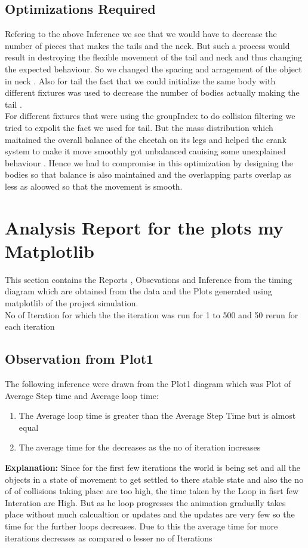 \documentclass[11pt]{article}
\begin{document}
\subsection{Optimizations Required}
Refering to the above Inference we see that we would have to decrease the number of pieces that makes the tails and the neck. 
But such a process would result in destroying the flexible movement of the tail and neck and thus changing the expected behaviour.
So we changed the spacing and arragement of the object in neck . Also for tail the fact that we could initialize the same body with
different fixtures was used to decrease the number of bodies actually making the tail .\\
For different fixtures that were using the groupIndex to do collision filtering we tried to expolit the fact we used for tail.
But the mass distribution which maitained the overall balance of the cheetah on its legs and helped the crank system to make it move smoothly
got unbalanced cauising some unexplained behaviour . Hence we had to compromise in this optimization by designing the bodies so that balance 
is also maintained and the overlapping parts overlap as less as aloowed so that the movement is smooth. 

\section{Analysis Report for the plots my Matplotlib}
This section contains the Reports , Obsevations and Inference from the timing diagram which are obtained from the data and the 
Plots generated using matplotlib of the project simulation.\\
No of Iteration for which the 	the iteration was run for 1 to 500 and 50 rerun for each iteration
\subsection{Observation from Plot1}
The following inference were drawn from the Plot1 diagram which was Plot of Average Step time  and Average loop time:
\begin{enumerate}
    \item The Average loop time is greater than the Average Step Time but is almost equal
    \item The average time for the decreases as the no of iteration increases
\end{enumerate}
\textbf{Explanation:}
Since for the first few iterations the world is being set and all the objects in a state of movement to get settled to there stable state
and also the no of of collisions taking place are too high, the time taken by the Loop in fisrt few Interation are High.
But as he loop progresses the animation gradually takes place without much calcualtion or updates and the updates are very few so the time for 
the further loops decreases. Due to this the average time for more iterations decreases as compared o lesser no of Iterations\\
\end{document}

